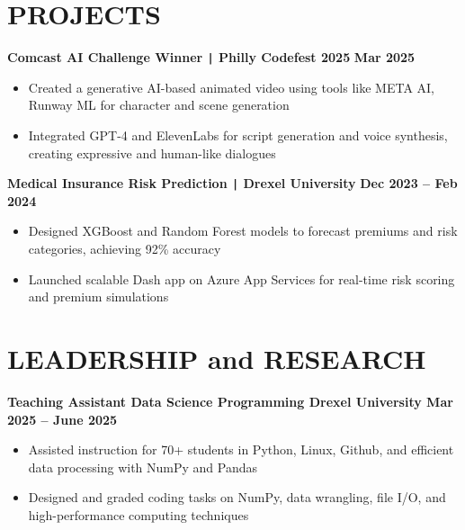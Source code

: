 \documentclass[10pt]{article}
\begin{document}
\vspace{-0.75cm}
\section*{PROJECTS}
\vspace{-0.1cm}

\noindent
\textbf{Comcast AI Challenge Winner \texttt{|} Philly Codefest 2025} \hfill \textbf{Mar 2025} \\
\vspace{-0.4cm}
\begin{itemize}[leftmargin=0.6cm, itemsep=-0.1cm, topsep=0cm]

    \item Created a generative AI-based animated video using tools like META AI, Runway ML for character and scene generation

    \item Integrated GPT-4 and ElevenLabs for script generation and voice synthesis, creating expressive and human-like dialogues

\end{itemize}

\noindent
\textbf{Medical Insurance Risk Prediction \texttt{|} Drexel University} \hfill \textbf{Dec 2023 -- Feb 2024} \\
\vspace{-0.4cm}
\begin{itemize}[leftmargin=0.6cm, itemsep=-0.1cm, topsep=0cm]

    \item Designed XGBoost and Random Forest models to forecast premiums and risk categories, achieving 92\% accuracy

    \item Launched scalable Dash app on Azure App Services for real-time risk scoring and premium simulations

\end{itemize}


\vspace{-0.4cm}
\section*{LEADERSHIP and RESEARCH}
\vspace{-0.1cm}

\noindent
\textbf{Teaching Assistant \textbar{} Data Science Programming \textbar{} Drexel University  \hfill Mar 2025 -- June 2025} \\
\vspace{-0.4cm}
\begin{itemize}[leftmargin=0.6cm, itemsep=-0.1cm, topsep=0cm]

    \item Assisted instruction for 70+ students in Python, Linux, Github, and efficient data processing with NumPy and Pandas

    \item Designed and graded coding tasks on  NumPy, data wrangling, file I/O, and high-performance computing techniques

\end{itemize}
\end{document}
